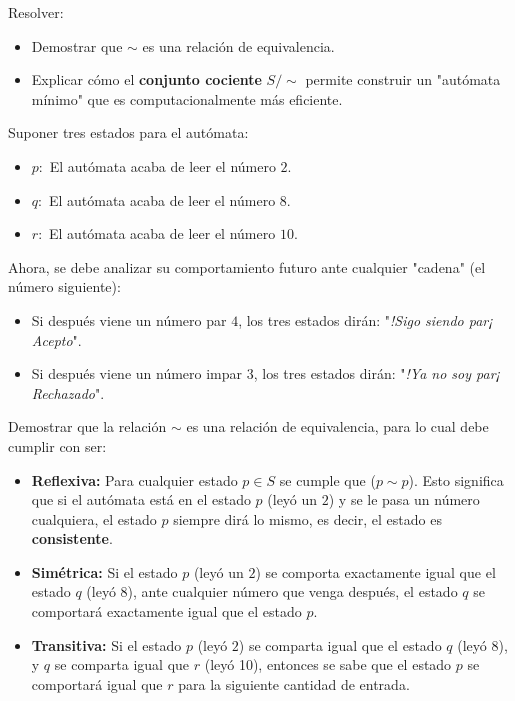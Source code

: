 \documentclass{article}
\begin{document}
Resolver:

\begin{itemize}
    \item Demostrar que $\sim$ es una relación de equivalencia.
    \item Explicar cómo el \textbf{conjunto cociente} $S / \sim$ permite construir un "autómata mínimo" que es computacionalmente más eficiente.
\end{itemize}

Suponer tres estados para el autómata:

\begin{itemize}
    \item $p:$ El autómata acaba de leer el número $2$.
    \item $q:$ El autómata acaba de leer el número $8$.
    \item $r:$ El autómata acaba de leer el número $10$.
\end{itemize}

Ahora, se debe analizar su comportamiento futuro ante cualquier "cadena" (el número siguiente):

\begin{itemize}
    \item Si después viene un número par $4$, los tres estados dirán: "\textit{!Sigo siendo par¡ Acepto}".
    \item Si después viene un número impar $3$, los tres estados dirán: "\textit{!Ya no soy par¡ Rechazado}".
\end{itemize}

Demostrar que la relación $\sim$ es una relación de equivalencia, para lo cual debe cumplir con ser:

\begin{itemize}
    \item \textbf{Reflexiva:} Para cualquier estado $p \in S$ se cumple que ($p \sim p$). Esto significa que si el autómata está en el estado $p$ (leyó un $2$) y se le pasa un número cualquiera, el estado $p$ siempre dirá lo mismo, es decir, el estado es \textbf{consistente}.
    \item \textbf{Simétrica:} Si el estado $p$ (leyó un $2$) se comporta exactamente igual que el estado $q$ (leyó $8$), ante cualquier número que venga después, el estado $q$ se comportará exactamente igual que el estado $p$.
    \item \textbf{Transitiva:} Si el estado $p$ (leyó $2$) se comparta igual que el estado $q$ (leyó $8$), y $q$ se comparta igual que $r$ (leyó 10), entonces se sabe que el estado $p$ se comportará igual que $r$ para la siguiente cantidad de entrada.
\end{itemize}
\end{document}
